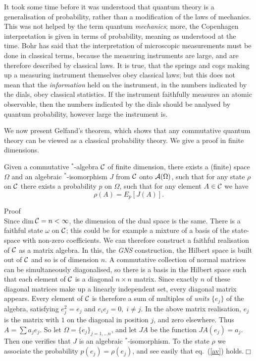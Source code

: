 It took some time before it was understood that quantum theory is a
generalisation of probability, rather than a modification of the laws of
mechanics. This was not helped by the term quantum {\em mechanics}; more,
the Copenhagen interpretation is given in terms of probability, meaning
as understood at the time. Bohr has said \cite{Schilpp} that the
interpretation of microscopic measurements must be done in classical
terms, because the measuring instruments are large, and are therefore
described by classical laws. It is true, that the springs and cogs making
up a measuring instrument themselves obey classical laws; but this does not
mean that the {\em information} held on the instrument, in the numbers
indicated by the dials, obey classical statistics. If the instrument
faithfully measures an atomic observable, then the numbers indicated by the
dials should be analysed by quantum probability, however large the
instrument is.

We now present Gelfand's theorem, which shows that any
commutative quantum theory can be viewed as a classical probability
theory. We give a proof in finite dimensions.
\begin{theorem}
Given a commutative $^*$-algebra ${\cal C}$ of finite dimension, there
exists a (finite) space $\Omega$ and an algebraic $^*$-isomorphism $J$ from
${\cal C}$ onto ${\cal A}(\Omega)$, such that for any state $\rho$ on
${\cal C}$ there exists a probability $p$ on $\Omega$, such that for any
element $A\in{\cal C}$ we have
\begin{equation}
\rho(A)=E_p[J(A)].
\label{av}
\end{equation}
\end{theorem}
Proof\\
Since dim$\,{\cal C}=n<\infty$, the dimension of the dual space is the same.
There is a faithful state $\omega$ on ${\cal C}$; this could be for example
a mixture of a basis of the state-space with non-zero coefficients.
We can therefore construct a faithful realisation of ${\cal C}$ as a matrix
algebra. In this, the {\em GNS} construction,
the Hilbert space is built out of ${\cal C}$ and so is of
dimension $n$. A commutative collection of normal matrices can be simultaneously
diagonalised, so there is a basis in the Hilbert space such that each
element of ${\cal C}$ is a diagonal $n\times n$ matrix. Since exactly
$n$ of these diagonal matrices make up a linearly independent set, every
diagonal matrix appears. Every element of ${\cal C}$ is therefore a sum
of multiples of {\em units} $\{e_j\}$ of the algebra, satisfying $e_j^2=e_j$ and
$e_ie_j=0,\;i\neq j$. In the above matrix realisation, $e_j$ is the matrix
with $1$  on the diagonal in position $j$, and zero elsewhere.
Thus $A=\sum a_je_j$. So let $\Omega=\{e_j\}_{j=1,\ldots n}$, and let $JA$
be the function $JA(e_j)=a_j$. Then one verifies that $J$ is an algebraic
$^*$-isomorphism. To the state $\rho$ we associate the probability
$p(e_j)=\rho(e_j)$, and see easily that eq.~(\ref{av})
holds.\hspace{\fill}$\Box$

